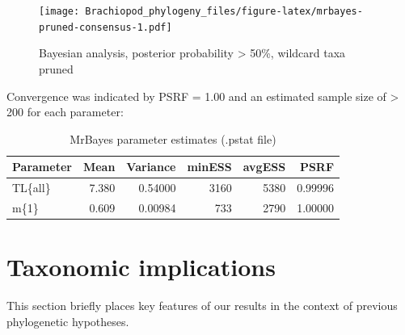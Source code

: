 \documentclass[]{book}
\theoremstyle{definition}
\theoremstyle{definition}
\theoremstyle{definition}
\theoremstyle{remark}
\begin{document}
\begin{figure}
\centering
\texttt{[image: Brachiopod\_phylogeny\_files/figure-latex/mrbayes-pruned-consensus-1.pdf]}
\caption{\label{fig:mrbayes-pruned-consensus}Bayesian analysis, posterior
probability \textgreater{} 50\%, wildcard taxa pruned}
\end{figure}

Convergence was indicated by PSRF = 1.00 and an estimated sample size of
\textgreater{} 200 for each parameter:

\begin{table}

\caption{\label{tab:mrbayes-parameter-summary}MrBayes parameter estimates (.pstat file)}
\centering
\begin{tabular}[t]{l|r|r|r|r|r}
\hline
Parameter & Mean & Variance & minESS & avgESS & PSRF\\
\hline
TL\{all\} & 7.380 & 0.54000 & 3160 & 5380 & 0.99996\\
\hline
m\{1\} & 0.609 & 0.00984 & 733 & 2790 & 1.00000\\
\hline
\end{tabular}
\end{table}

\hypertarget{taxonomic-implications}{%
\chapter{Taxonomic implications}\label{taxonomic-implications}}

This section briefly places key features of our results in the context
of previous phylogenetic hypotheses.
\end{document}
